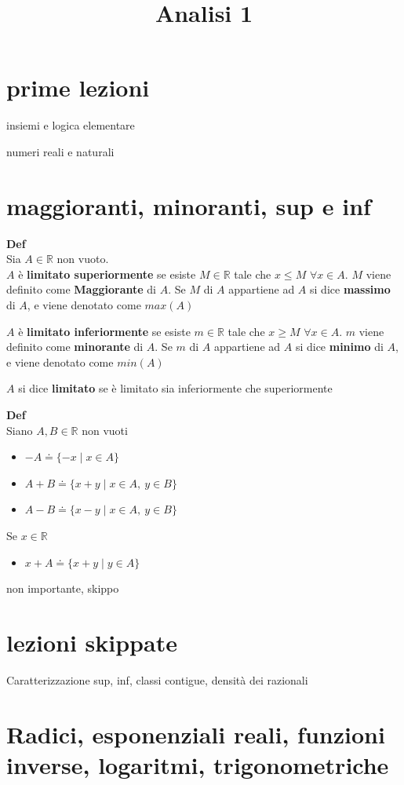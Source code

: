 \documentclass[12pt, a4paper]{article}
\title{Analisi 1}
\begin{document}
\section{prime lezioni}
insiemi e logica elementare

numeri reali e naturali

\section{maggioranti, minoranti, sup e inf}

\textbf{Def}\\ Sia $A\in\mathbb{R}$ non vuoto.\\ $A$ è \textbf{limitato superiormente} se esiste $M\in\mathbb{R}$
tale che $x\leq M$ $\forall x\in A$. $M$ viene definito come \textbf{Maggiorante} di $A$. Se $M$ di $A$ appartiene
ad $A$ si dice \textbf{massimo} di $A$, e viene denotato come $max(A)$

$A$ è \textbf{limitato inferiormente} se esiste $m\in\mathbb{R}$ tale che $x\geq M$ $\forall x\in A$. $m$ viene
definito come \textbf{minorante} di $A$. Se $m$ di $A$ appartiene ad $A$ si dice \textbf{minimo} di $A$, e viene
denotato come $min(A)$

$A$ si dice \textbf{limitato} se è limitato sia inferiormente che superiormente

\textbf{Def}\\ Siano $A,B\in\mathbb{R}$ non vuoti
\begin{itemize}
    \item $-A \doteq \{-x \mid x\in A\}$
    \item $A+B \doteq \{x+y\mid x\in A,\ y\in B\}$
    \item $A-B \doteq \{x-y\mid x\in A,\ y\in B\}$
\end{itemize}
Se $x\in\mathbb{R}$
\begin{itemize}
    \item $x+A\doteq\{x+y\mid y\in A\}$
\end{itemize}

non importante, skippo

\section{lezioni skippate}
Caratterizzazione sup, inf, classi contigue, densità dei razionali

\section{Radici, esponenziali reali, funzioni inverse, logaritmi, trigonometriche}
\end{document}
